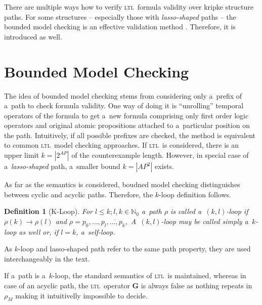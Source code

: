 \documentclass[12pt,oneside,draft]{fithesis}
\newcommand{\ltl}{\textsc{ltl}~}
\newcommand{\mNatural}{\mathbb{N}}
\newcommand{\bG}{\mathbf{G}}
\newtheorem{mydef}{Definition}
\begin{document}
There are multiple ways how to verify \ltl formula validity over kripke
structure paths. For some structures -- especially those with
\emph{lasso-shaped} paths -- the bounded model checking is an effective
validation method \cite{biere}. Therefore, it is introduced as well.

\section{Bounded Model Checking}
The idea of bounded model checking stems from considering only a~prefix
of a~path to check formula validity. One way of doing it is ``unrolling''
temporal operators of the formula to get a~new formula comprising only
first order logic operators and original atomic propositions attached
to a~particular position on the path. Intuitively, if all possible
prefixes are checked, the method is equivalent to common \ltl model
checking approaches. If \ltl is considered, there is an upper
limit $k=|2^{AP}|$ of the counterexample length\cite{biere}. However, in
special case of a~\emph{lasso-shaped} path, a~smaller bound $k=|AP^2|$
exists\cite{biere}.

As far as the semantics is considered, boudned model checking
distinguishes between cyclic and acyclic paths. Therefore, the $k$-loop
definition follows.
\begin{mydef}[K-Loop]
For $l\leq k;l,k\in\mNatural_0$ a~path $\rho$ is called a~$(k,l)$-loop
if $\rho(k)\rightarrow\rho(l)$ and
$\rho=p_0,\dotsc,\overline{p_{l},\dotsc,p_{k},}$
A~$(k,l)$-loop may be called simply a~$k$-loop as well or, if $l=k$,
a~self-loop.
\end{mydef}
As $k$-loop and lasso-shaped path refer to the same path property, they
are used interchangeably in the text.

If a~path is a~$k$-loop, the standard semantics of \ltl is maintained,
whereas in case of an acyclic path, the \ltl operator $\bG$ is always
false as nothing repeats in $\rho_M$ making it intuitivelly impossible
to decide.
\end{document}
